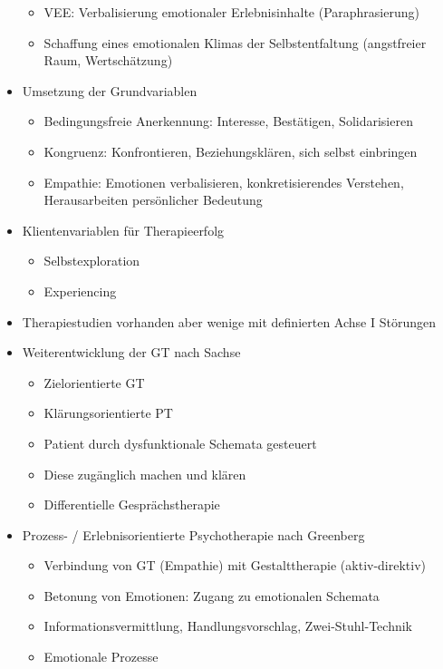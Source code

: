 \documentclass[11pt, paper=a4, twocolumn]{scrartcl}
\begin{document}
\begin{itemize}
\begin{itemize}
					\item VEE: Verbalisierung emotionaler Erlebnisinhalte (Paraphrasierung)
					\item Schaffung eines emotionalen Klimas der Selbstentfaltung (angstfreier Raum, Wertschätzung)
				\end{itemize}
			\item Umsetzung der Grundvariablen
				\begin{itemize}
					\item Bedingungsfreie Anerkennung: Interesse, Bestätigen, Solidarisieren
					\item Kongruenz: Konfrontieren, Beziehungsklären, sich selbst einbringen
					\item Empathie: Emotionen verbalisieren, konkretisierendes Verstehen, Herausarbeiten persönlicher Bedeutung
				\end{itemize}
			\item Klientenvariablen für Therapieerfolg
				\begin{itemize}
					\item Selbstexploration
					\item Experiencing
				\end{itemize}
			\item Therapiestudien vorhanden aber wenige mit definierten Achse I Störungen
			\item Weiterentwicklung der GT nach Sachse
				\begin{itemize}
					\item Zielorientierte GT
					\item Klärungsorientierte PT
					\item Patient durch dysfunktionale Schemata gesteuert
					\item Diese zugänglich machen und klären
					\item Differentielle Gesprächstherapie
				\end{itemize}
			\item Prozess- / Erlebnisorientierte Psychotherapie nach Greenberg
				\begin{itemize}
					\item Verbindung von GT (Empathie) mit Gestalttherapie (aktiv-direktiv)
					\item Betonung von Emotionen: Zugang zu emotionalen Schemata
					\item Informationsvermittlung, Handlungsvorschlag, Zwei-Stuhl-Technik
					\item Emotionale Prozesse
						\begin{itemize}

\end{itemize}
\end{itemize}
\end{itemize}
\end{document}
